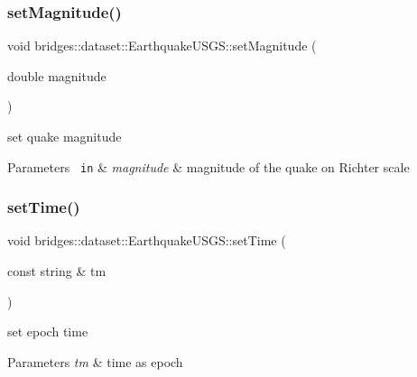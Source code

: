 \subsubsection{\texorpdfstring{setMagnitude()}{setMagnitude()}}
{\footnotesize\ttfamily void bridges\+::dataset\+::\+Earthquake\+U\+S\+G\+S\+::set\+Magnitude (\begin{DoxyParamCaption}\item[{double}]{magnitude }\end{DoxyParamCaption})\hspace{0.3cm}{\ttfamily [inline]}}



set quake magnitude 


\begin{DoxyParams}[1]{Parameters}
\mbox{\texttt{ in}}  & {\em magnitude} & magnitude of the quake on Richter scale \\
\hline
\end{DoxyParams}
\mbox{\label{classbridges_1_1dataset_1_1_earthquake_u_s_g_s_af191301bcbaa5278480a57e9aea674d7}} 
\subsubsection{\texorpdfstring{setTime()}{setTime()}}
{\footnotesize\ttfamily void bridges\+::dataset\+::\+Earthquake\+U\+S\+G\+S\+::set\+Time (\begin{DoxyParamCaption}\item[{const string \&}]{tm }\end{DoxyParamCaption})\hspace{0.3cm}{\ttfamily [inline]}}



set epoch time 


\begin{DoxyParams}{Parameters}
{\em tm} & time as epoch \\
\hline
\end{DoxyParams}
\mbox{\label{classbridges_1_1dataset_1_1_earthquake_u_s_g_s_a8a479d05e3f3896d4eeaad1bcccf9f02}} 
